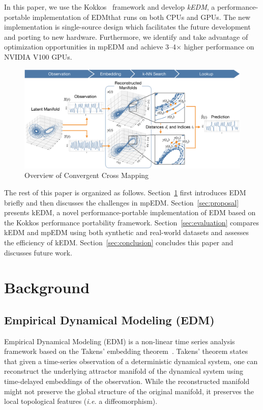 \documentclass[conference]{IEEEtran}
\begin{document}
In this paper, we use the Kokkos~\cite{Edwards2014} framework and develop
\textit{kEDM}, a performance-portable implementation of EDM\@ that runs on
both CPUs and GPUs. The new implementation is single-source design which
facilitates the future development and porting to new hardware. Furthermore,
we identify and take advantage of optimization opportunities in mpEDM and
achieve 3--4$\times$ higher performance on NVIDIA V100 GPUs.

\begin{figure}
    \centering
    \includegraphics[width=1.0\linewidth]{figs/xmap_overview}
    \caption{Overview of Convergent Cross Mapping}%
    \label{fig:edm}
\end{figure}

The rest of this paper is organized as follows. Section~\ref{sec:background}
first introduces EDM briefly and then discusses the challenges in mpEDM\@.
Section~\ref{sec:proposal} presents kEDM, a novel performance-portable
implementation of EDM based on the Kokkos performance portability framework.
Section~\ref{sec:evaluation} compares kEDM and mpEDM using both synthetic and
real-world datasets and assesses the efficiency of kEDM\@.
Section~\ref{sec:conclusion} concludes this paper and discusses future work.

\section{Background}\label{sec:background}

\subsection{Empirical Dynamical Modeling (EDM)}\label{sec:edm}

Empirical Dynamical Modeling (EDM) is a non-linear time series analysis
framework based on the Takens' embedding theorem~\cite{Deyle2011}. Takens'
theorem states that given a time-series observation of a deterministic
dynamical system, one can reconstruct the underlying attractor manifold of the
dynamical system using time-delayed embeddings of the observation. While the
reconstructed manifold might not preserve the global structure of the original
manifold, it preserves the local topological features (\textit{i.e.} a
diffeomorphism).
\end{document}
